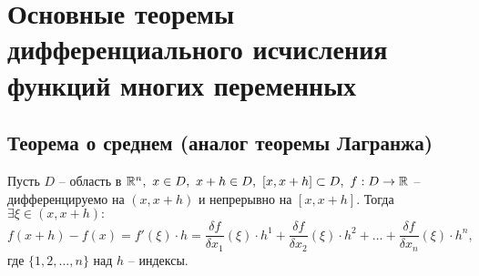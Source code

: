 \section{Основные теоремы дифференциального исчисления функций многих переменных}

\setcounter{subsection}{4}

\subsection{Теорема о среднем (аналог теоремы Лагранжа)}

\begin{theorem}[О среднем]
    Пусть $ D $ -- область в $ \R^n, \ x \in D, \ x + h \in D, \ [x, x+h]\subset D, \ f: D \rightarrow\R $ -- дифференцируемо на $ (x,x+h) $ и непрерывно на $ [x,x+h] $. Тогда $ \exists \xi \in (x,x+h): $
    \[
        f(x+h)-f(x) = f'(\xi)\cdot h = \frac{\delta f}{\delta x_1}(\xi)\cdot h^1 + \frac{\delta f}{\delta x_2}(\xi)\cdot h^2 + \ldots + \frac{\delta f}{\delta x_n}(\xi)\cdot h^n,
    \] где $ \{1,2,\ldots,n\} $ над $ h $ -- индексы.
\end{theorem}

